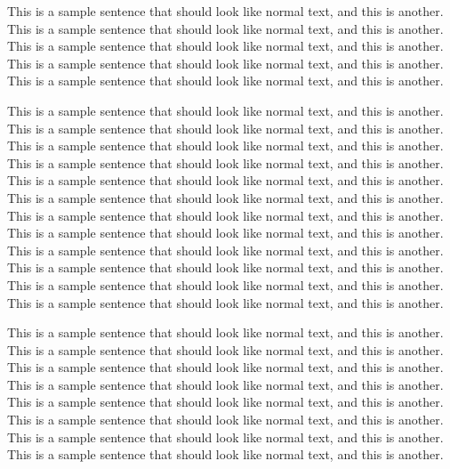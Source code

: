 

This is a sample sentence that should look like normal text, and this
is another. This is a sample sentence that should look like normal
text, and this is another. This is a sample sentence that should look
like normal text, and this is another. This is a sample sentence that
should look like normal text, and this is another. This is a sample
sentence that should look like normal text, and this is another.


This is a sample sentence that should look like normal text, and this
is another. This is a sample sentence that should look like normal
text, and this is another. This is a sample sentence that should look
like normal text, and this is another. This is a sample sentence that
should look like normal text, and this is another. This is a sample
sentence that should look like normal text, and this is another. This
is a sample sentence that should look like normal text, and this is
another. This is a sample sentence that should look like normal text,
and this is another. This is a sample sentence that should look like
normal text, and this is another. This is a sample sentence that
should look like normal text, and this is another. This is a sample
sentence that should look like normal text, and this is another. This
is a sample sentence that should look like normal text, and this is
another. This is a sample sentence that should look like normal text,
and this is another.

This is a sample sentence that should look like normal text, and this
is another. This is a sample sentence that should look like normal
text, and this is another. This is a sample sentence that should look
like normal text, and this is another. This is a sample sentence that
should look like normal text, and this is another. This is a sample
sentence that should look like normal text, and this is another. This
is a sample sentence that should look like normal text, and this is
another. This is a sample sentence that should look like normal text,
and this is another. This is a sample sentence that should look like
normal text, and this is another.